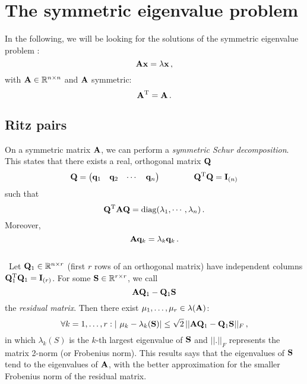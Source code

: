\section{The symmetric eigenvalue problem}
    In the following, we will be looking for the solutions of the symmetric eigenvalue problem \cite{golub}:
    \begin{equation}
        \vb{A} \vb{x} = \lambda \vb{x} \thinspace ,
    \end{equation}
    with $\vb{A} \in \mathbb{R}^{n \times n}$ and $\vb{A}$ symmetric:
    \begin{equation}
        \vb{A}^\text{T} = \vb{A} \thinspace .
    \end{equation}

    \subsection{Ritz pairs} \label{sec:ritz}
        On a symmetric matrix $\vb{A}$, we can perform a \emph{symmetric Schur decomposition}. This states that there exists a real, orthogonal matrix $\vb{Q}$
        \begin{equation}
            \vb{Q} = \begin{pmatrix} \vb{q}_1 & \vb{q}_2 & \cdots & \vb{q}_n \end{pmatrix} \qquad \qquad \vb{Q}^\text{T} \vb{Q} = \vb{I}_{(n)}
        \end{equation}
        such that
        \begin{equation}
            \vb{Q}^\text{T} \vb{A} \vb{Q} = \operatorname{diag}(\lambda_1, \cdots, \lambda_n) \thinspace .
        \end{equation}
        Moreover,
        \begin{equation}
            \vb{A} \vb{q}_k = \lambda_k \vb{q}_k \thinspace .
        \end{equation}
        \\\
        Let $\vb{Q}_1 \in \mathbb{R}^{n \times r}$ (first $r$ rows of an orthogonal matrix) have independent columns $\vb{Q}_1^\text{T} \vb{Q}_1 = \vb{I}_{(r)}$. For some $\vb{S} \in \mathbb{R}^{r \times r}$, we call
        \begin{equation}
            \vb{A}\vb{Q}_1 - \vb{Q}_1 \vb{S}
        \end{equation}
        the \emph{residual matrix}. Then there exist $\mu_1, \dots, \mu_r \in \lambda(\vb{A})$:
        \begin{equation} \label{eq:mu_lambda_residue}
            \forall k=1, \dots, r: | \mu_k - \lambda_k(\vb{S})| \leq \sqrt{2} \thinspace || \vb{A}\vb{Q}_1 - \vb{Q}_1 \vb{S} ||_F \thinspace ,
        \end{equation}
        in which $\lambda_k(S)$ is the $k$-th largest eigenvalue of $\vb{S}$ and $||.||_F$ represents the matrix 2-norm (or Frobenius norm). This results says that the eigenvalues of $\vb{S}$ tend to the eigenvalues of $\vb{A}$, with the better approximation for the smaller Frobenius norm of the residual matrix.\\

